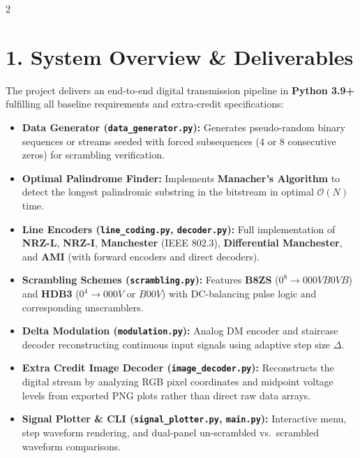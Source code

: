 \documentclass[8.5pt,a4paper]{article}
\begin{document}
\begin{multicols}{2}

\section{1. System Overview \& Deliverables}
The project delivers an end-to-end digital transmission pipeline in \textbf{Python 3.9+} fulfilling all baseline requirements and extra-credit specifications:
\begin{itemize}
    \item \textbf{Data Generator (\texttt{data\_generator.py}):} Generates pseudo-random binary sequences or streams seeded with forced subsequences ($4$ or $8$ consecutive zeros) for scrambling verification.
    \item \textbf{Optimal Palindrome Finder:} Implements \textbf{Manacher's Algorithm} to detect the longest palindromic substring in the bitstream in optimal $\mathcal{O}(N)$ time.
    \item \textbf{Line Encoders (\texttt{line\_coding.py}, \texttt{decoder.py}):} Full implementation of \textbf{NRZ-L}, \textbf{NRZ-I}, \textbf{Manchester} (IEEE 802.3), \textbf{Differential Manchester}, and \textbf{AMI} (with forward encoders and direct decoders).
    \item \textbf{Scrambling Schemes (\texttt{scrambling.py}):} Features \textbf{B8ZS} ($0^8 \to 000VB0VB$) and \textbf{HDB3} ($0^4 \to 000V$ or $B00V$) with DC-balancing pulse logic and corresponding unscramblers.
    \item \textbf{Delta Modulation (\texttt{modulation.py}):} Analog DM encoder and staircase decoder reconstructing continuous input signals using adaptive step size $\Delta$.
    \item \textbf{Extra Credit Image Decoder (\texttt{image\_decoder.py}):} Reconstructs the digital stream by analyzing RGB pixel coordinates and midpoint voltage levels from exported PNG plots rather than direct raw data arrays.
    \item \textbf{Signal Plotter \& CLI (\texttt{signal\_plotter.py}, \texttt{main.py}):} Interactive menu, step waveform rendering, and dual-panel un-scrambled vs.\ scrambled waveform comparisons.
\end{itemize}


\end{multicols}
\end{document}
